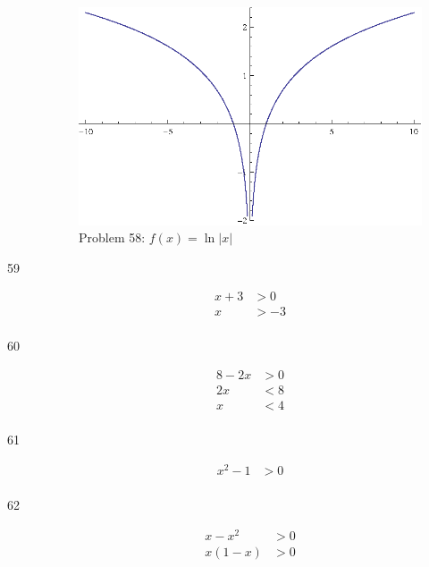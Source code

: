 \documentclass{exam}
\begin{document}
\begin{description}
      \begin{figure}[H]
        \centering
        \includegraphics[scale = 0.9]{problem58.eps}
        \caption{Problem 58: $f(x) = \ln |x|$}
      \end{figure}

    \item[59]
      \begin{align*}
        x + 3 & > 0 \\
        x     & > -3 \\
      \end{align*}


    \item[60]
      \begin{align*}
        8 - 2x & > 0 \\
        2x     & < 8 \\
        x      & < 4 \\
      \end{align*}


    \item[61]
      \begin{align*}
        x^2 - 1 & > 0 \\
      \end{align*}


    \item[62]
      \begin{align*}
        x - x^2  & > 0 \\
        x(1 - x) & > 0 \\
      \end{align*}


\end{description}
\end{document}
